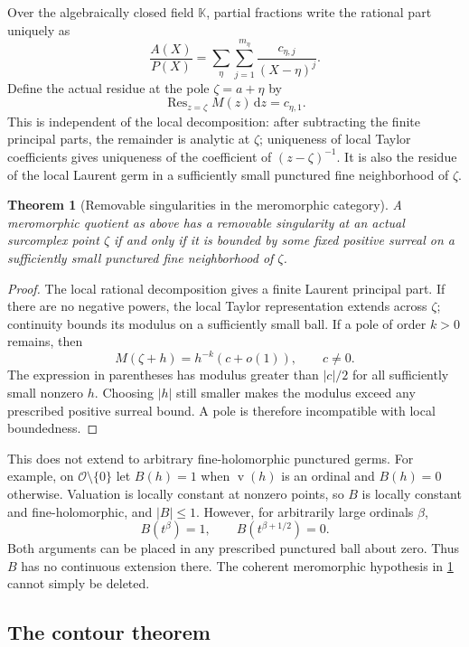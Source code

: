 \documentclass[11pt,letterpaper]{article}
\numberwithin{equation}{section}
\newtheorem{theorem}{Theorem}[section]
\theoremstyle{definition}
\theoremstyle{remark}
\newcommand{\K}{\mathbb{K}}
\newcommand{\OO}{\mathcal{O}}
\newcommand{\dd}{\,\mathrm{d}}
\newcommand{\Res}{\operatorname{Res}}
\newcommand{\val}{\operatorname{v}}
\begin{document}
Over the algebraically closed field $\K$, partial fractions write the rational
part uniquely as
\[
 \frac{A(X)}{P(X)}=
 \sum_{\eta}\sum_{j=1}^{m_\eta}\frac{c_{\eta,j}}{(X-\eta)^j}.
\]
Define the actual residue at the pole $\zeta=a+\eta$ by
\begin{equation}\label{eq:actualresidue}
 \Res_{z=\zeta}M(z)\dd z=c_{\eta,1}.
\end{equation}
This is independent of the local decomposition: after subtracting the finite
principal parts, the remainder is analytic at $\zeta$; uniqueness of local
Taylor coefficients gives uniqueness of the coefficient of
$(z-\zeta)^{-1}$. It is also the residue of the local Laurent germ in a
sufficiently small punctured fine neighborhood of $\zeta$.

\begin{theorem}[Removable singularities in the meromorphic category]\label{thm:removable}
A meromorphic quotient as above has a removable singularity at an actual
surcomplex point $\zeta$ if and only if it is bounded by some fixed positive
surreal on a sufficiently small punctured fine neighborhood of $\zeta$.
\end{theorem}
\begin{proof}
The local rational decomposition gives a finite Laurent principal part.
If there are no negative powers, the local Taylor representation extends
across $\zeta$; continuity bounds its modulus on a sufficiently small ball.
If a pole of order $k>0$ remains, then
\[
 M(\zeta+h)=h^{-k}(c+o(1)),\qquad c\ne0.
\]
The expression in parentheses has modulus greater than $|c|/2$ for all
sufficiently small nonzero $h$. Choosing $|h|$ still smaller makes the
modulus exceed any prescribed positive surreal bound. A pole is therefore
incompatible with local boundedness.
\end{proof}

This does not extend to arbitrary fine-holomorphic punctured germs. For
example, on $\OO\setminus\{0\}$ let $B(h)=1$ when $\val(h)$ is an ordinal
and $B(h)=0$ otherwise. Valuation is locally constant at nonzero points, so
$B$ is locally constant and fine-holomorphic, and $|B|\le1$. However, for
arbitrarily large ordinals $\beta$,
\[
 B(t^\beta)=1,\qquad B(t^{\beta+1/2})=0.
\]
Both arguments can be placed in any prescribed punctured ball about zero.
Thus $B$ has no continuous extension there. The coherent meromorphic
hypothesis in \cref{thm:removable} cannot simply be deleted.

\subsection{The contour theorem}
\end{document}
